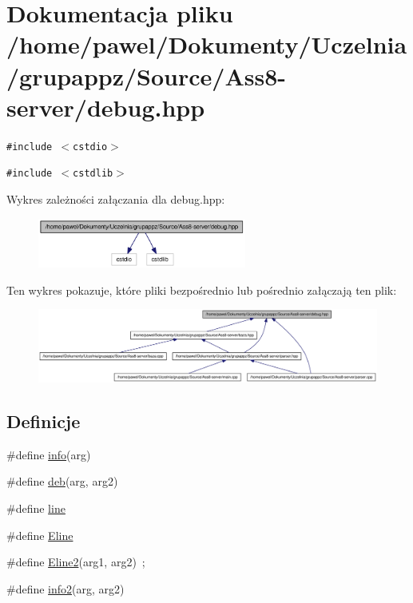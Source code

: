 \hypertarget{a00008}{
\section{Dokumentacja pliku /home/pawel/Dokumenty/Uczelnia/grupappz/Source/Ass8-server/debug.hpp}
\label{d4/dee/a00008}
}
{\tt \#include $<$cstdio$>$}\par
{\tt \#include $<$cstdlib$>$}\par


Wykres zależności załączania dla debug.hpp:\nopagebreak
\begin{figure}[H]
\begin{center}
\leavevmode
\includegraphics[width=194pt]{d1/dc6/a00037}
\end{center}
\end{figure}


Ten wykres pokazuje, które pliki bezpośrednio lub pośrednio załączają ten plik:\nopagebreak
\begin{figure}[H]
\begin{center}
\leavevmode
\includegraphics[width=420pt]{d8/d41/a00038}
\end{center}
\end{figure}
\subsection*{Definicje}
\begin{CompactItemize}
\item 
\#define \hyperlink{a00008_590af51ecfed28223c4e6ce02994241a}{info}(arg)
\item 
\#define \hyperlink{a00008_21ad5938437ed6d1865dd14c8d1871bc}{deb}(arg, arg2)
\item 
\#define \hyperlink{a00008_5bdec07ba0f5f220bcb40d5258725d95}{line}
\item 
\#define \hyperlink{a00008_9944134306515208e366f3f347ef3653}{Eline}
\item 
\#define \hyperlink{a00008_68b6fd999967bd748d50fc2014bc5903}{Eline2}(arg1, arg2)~;
\item 
\#define \hyperlink{a00008_51633d6d15647d74f756bcf969fc70ae}{info2}(arg, arg2)
\end{CompactItemize}


